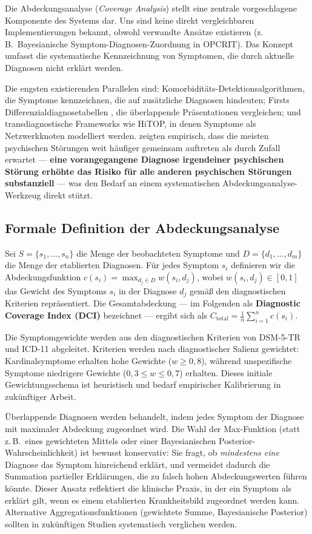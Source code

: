 \documentclass[11pt,a4paper]{article}
\begin{document}
Die Abdeckungsanalyse (\textit{Coverage Analysis}) stellt eine zentrale vorgeschlagene Komponente des Systems dar. Uns sind keine direkt vergleichbaren Implementierungen bekannt, obwohl verwandte Ans\"atze existieren (z.\,B.\ Bayesianische Symptom-Diagnosen-Zuordnung in OPCRIT). Das Konzept umfasst die systematische Kennzeichnung von Symptomen, die durch aktuelle Diagnosen nicht erkl\"art werden.

Die engsten existierenden Parallelen sind: Komorbidit\"ats-Detektionsalgorithmen, die Symptome kennzeichnen, die auf zus\"atzliche Diagnosen hindeuten; Firsts Differenzialdiagnosetabellen \citep{First2024}, die \"uberlappende Pr\"asentationen vergleichen; und transdiagnostische Frameworks wie HiTOP, in denen Symptome als Netzwerkknoten modelliert werden. \citet{PlanaRipoll2019} zeigten empirisch, dass die meisten psychischen St\"orungen weit h\"aufiger gemeinsam auftreten als durch Zufall erwartet --- \textbf{eine vorangegangene Diagnose irgendeiner psychischen St\"orung erh\"ohte das Risiko f\"ur alle anderen psychischen St\"orungen substanziell} --- was den Bedarf an einem systematischen Abdeckungsanalyse-Werkzeug direkt st\"utzt.

\subsection{Formale Definition der Abdeckungsanalyse}

Sei $S = \{s_1, \ldots, s_n\}$ die Menge der beobachteten Symptome und $D = \{d_1, \ldots, d_m\}$ die Menge der etablierten Diagnosen. F\"ur jedes Symptom $s_i$ definieren wir die Abdeckungsfunktion $c(s_i) = \max_{d_j \in D} w(s_i, d_j)$, wobei $w(s_i, d_j) \in [0, 1]$ das Gewicht des Symptoms $s_i$ in der Diagnose $d_j$ gem\"a\ss{} den diagnostischen Kriterien repr\"asentiert. Die Gesamtabdeckung --- im Folgenden als \textbf{Diagnostic Coverage Index (DCI)} bezeichnet --- ergibt sich als $C_{\text{total}} = \frac{1}{n} \sum_{i=1}^{n} c(s_i)$.

Die Symptomgewichte werden aus den diagnostischen Kriterien von DSM-5-TR und ICD-11 abgeleitet. Kriterien werden nach diagnostischer Salienz gewichtet: Kardinalsymptome erhalten hohe Gewichte ($w \geq 0{,}8$), w\"ahrend unspezifische Symptome niedrigere Gewichte ($0{,}3 \leq w \leq 0{,}7$) erhalten. Dieses initiale Gewichtungsschema ist heuristisch und bedarf empirischer Kalibrierung in zuk\"unftiger Arbeit.

\"Uberlappende Diagnosen werden behandelt, indem jedes Symptom der Diagnose mit maximaler Abdeckung zugeordnet wird. Die Wahl der Max-Funktion (statt z.\,B.\ eines gewichteten Mittels oder einer Bayesianischen Posterior-Wahrscheinlichkeit) ist bewusst konservativ: Sie fragt, ob \textit{mindestens eine} Diagnose das Symptom hinreichend erkl\"art, und vermeidet dadurch die Summation partieller Erkl\"arungen, die zu falsch hohen Abdeckungswerten f\"uhren k\"onnte. Dieser Ansatz reflektiert die klinische Praxis, in der ein Symptom als \glqq erkl\"art\grqq{} gilt, wenn es einem etablierten Krankheitsbild zugeordnet werden kann. Alternative Aggregationsfunktionen (gewichtete Summe, Bayesianische Posterior) sollten in zuk\"unftigen Studien systematisch verglichen werden.
\end{document}
